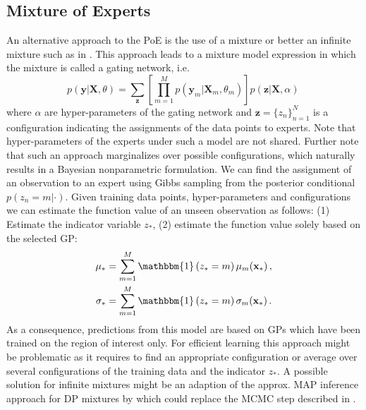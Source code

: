 \documentclass[10pt,letterpaper]{article}
\newcommand\indic[1]{\ensuremath{\mathbbm{1}\left(#1\right)}}
\newcommand{\X}{\mathbf{X}}
\newcommand{\x}{\mathbf{x}}
\newcommand{\y}{\mathbf{y}}
\newcommand{\new}{_{*}}
\theoremstyle{mystyle}
\begin{document}
\subsection{Mixture of Experts}
An alternative approach to the PoE is the use of a mixture or better an infinite mixture such as in \cite{RasmussenG2001}.
This approach leads to a mixture model expression in which the mixture is called a gating network, i.e.
\[
  p(\y | \X, \theta) = \sum_{\bm z} \left[ \prod_{m=1}^M p(\y_m | \X_m, \theta_m) \right] p(\bm z | \X, \alpha) \,
\]
where $\alpha$ are hyper-parameters of the gating network and $\bm z =\{z_n\}_{n=1}^N$ is a configuration indicating the assignments of the data points to experts.
Note that hyper-parameters of the experts under such a model are not shared.
Further note that such an approach marginalizes over possible configurations, which naturally results in a Bayesian nonparametric formulation. 
We can find the assignment of an observation to an expert using Gibbs sampling from the posterior conditional $p(z_n = m | \cdot)$. Given training data points, hyper-parameters and configurations we can estimate the function value of an unseen observation as follows: (1) Estimate the indicator variable $z\new$, (2) estimate the function value solely based on the selected GP:
\begin{align}
  \mu\new &= \sum_{m=1}^M \indic{z\new = m} \mu_m(\x\new) \, , \\
  \sigma\new &= \sum_{m=1}^M \indic{z\new = m} \sigma_m(\x\new) \, .
\end{align}
As a consequence, predictions from this model are based on GPs which have been trained on the region of interest only.
For efficient learning this approach might be problematic as it requires to find an appropriate configuration or average over several configurations of the training data and the indicator $z\new$.
A possible solution for infinite mixtures might be an adaption of the approx. MAP inference approach for DP mixtures by \cite{Raykov2016} which could replace the MCMC step described in \cite{RasmussenG2001}.
\end{document}
